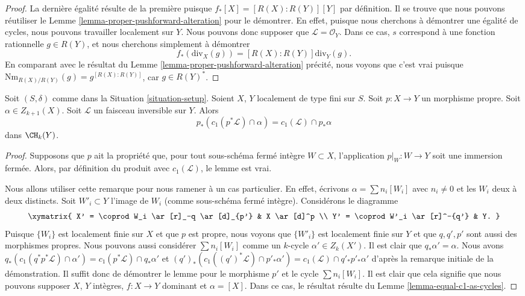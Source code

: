 \begin{proof}
La dernière égalité résulte de la première puisque $f_*[X] = [R(X) : R(Y)][Y]$
par définition. Il se trouve que nous pouvons réutiliser le
Lemme \ref{lemma-proper-pushforward-alteration}
pour le démontrer. En effet, puisque nous cherchons à démontrer une égalité
de cycles, nous pouvons travailler localement sur $Y$. Nous pouvons donc supposer
que $\mathcal{L} = \mathcal{O}_Y$. Dans ce cas, $s$
correspond à une fonction rationnelle $g \in R(Y)$, et
nous cherchons simplement à démontrer
$$
f_*\left(\text{div}_X(g)\right) =
[R(X) : R(Y)]\text{div}_Y(g).
$$
En comparant avec le résultat du
Lemme \ref{lemma-proper-pushforward-alteration} précité,
nous voyons que c'est vrai puisque
$\text{Nm}_{R(X)/R(Y)}(g) = g^{[R(X) : R(Y)]}$,
car $g \in R(Y)^*$.
\end{proof}

\begin{lemma}
\label{lemma-pushforward-cap-c1}
Soit $(S, \delta)$ comme dans la Situation \ref{situation-setup}.
Soient $X$, $Y$ localement de type fini sur $S$.
Soit $p : X \to Y$ un morphisme propre.
Soit $\alpha \in Z_{k + 1}(X)$.
Soit $\mathcal{L}$ un faisceau inversible sur $Y$.
Alors
$$
p_*(c_1(p^*\mathcal{L}) \cap \alpha) = c_1(\mathcal{L}) \cap p_*\alpha
$$
dans $\CH_k(Y)$.
\end{lemma}

\begin{proof}
Supposons que $p$ ait la propriété que, pour tout sous-schéma fermé
intègre $W \subset X$, l'application $p|_W : W \to Y$
soit une immersion fermée. Alors, par définition du produit
avec $c_1(\mathcal{L})$, le lemme est vrai.

\medskip\noindent
Nous allons utiliser cette remarque pour nous ramener à un cas particulier. En effet,
écrivons $\alpha = \sum n_i[W_i]$ avec $n_i \not = 0$ et les $W_i$ deux à deux
distincts. Soit $W'_i \subset Y$ l'image de $W_i$ (comme sous-schéma
fermé intègre). Considérons le diagramme
$$
\xymatrix{
X' = \coprod W_i \ar[r]_-q \ar[d]_{p'} & X \ar[d]^p \\
Y' = \coprod W'_i \ar[r]^-{q'} & Y.
}
$$
Puisque $\{W_i\}$ est localement finie sur $X$ et que $p$ est propre,
nous voyons que $\{W'_i\}$ est localement finie sur $Y$ et que
$q, q', p'$ sont aussi des morphismes propres.
Nous pouvons aussi considérer $\sum n_i[W_i]$ comme un $k$-cycle
$\alpha' \in Z_k(X')$. Il est clair que $q_*\alpha' = \alpha$.
Nous avons
$q_*(c_1(q^*p^*\mathcal{L}) \cap \alpha')
= c_1(p^*\mathcal{L}) \cap q_*\alpha'$
et
$(q')_*(c_1((q')^*\mathcal{L}) \cap p'_*\alpha') =
c_1(\mathcal{L}) \cap q'_*p'_*\alpha'$ d'après la remarque initiale
de la démonstration. Il suffit donc de démontrer le lemme
pour le morphisme $p'$ et le cycle $\sum n_i[W_i]$.
Il est clair que cela signifie que nous pouvons supposer $X$, $Y$ intègres,
$f : X \to Y$ dominant et $\alpha = [X]$.
Dans ce cas, le résultat résulte du
Lemme \ref{lemma-equal-c1-as-cycles}.
\end{proof}






